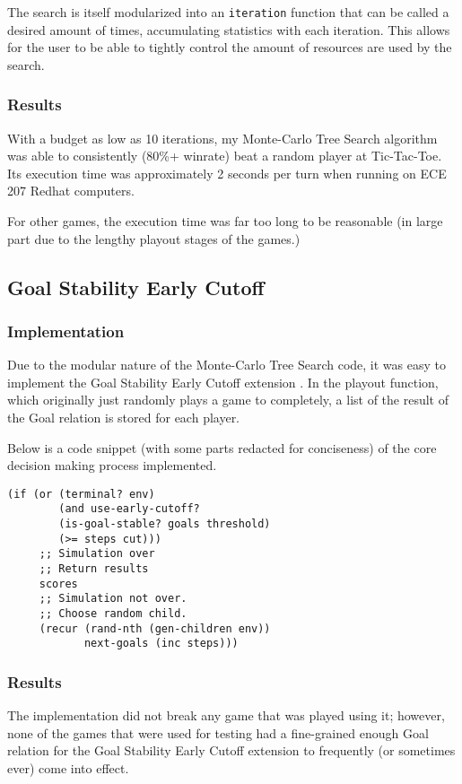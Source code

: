 \documentclass[letterpaper]{article}
\begin{document}
The search is itself modularized into an \texttt{iteration} function that can be called a desired amount of times, accumulating statistics with each iteration. This allows for the user to be able to tightly control the amount of resources are used by the search.

\subsubsection{Results}
With a budget as low as 10 iterations, my Monte-Carlo Tree Search algorithm was able to consistently (80\%+ winrate) beat a random player at Tic-Tac-Toe. Its execution time was approximately 2 seconds per turn when running on ECE 207 Redhat computers.

For other games, the execution time was far too long to be reasonable (in large part due to the lengthy playout stages of the games.)

\subsection{Goal Stability Early Cutoff}
\subsubsection{Implementation}
Due to the modular nature of the Monte-Carlo Tree Search code, it was easy to implement the Goal Stability Early Cutoff extension \cite{finnsson2012generalized}. In the playout function, which originally just randomly plays a game to completely, a list of the result of the Goal relation is stored for each player.

Below is a code snippet (with some parts redacted for conciseness) of the core decision making process implemented.
\begin{lstlisting}[frame=single,caption=Clojure implementation of Goal Stability Early Cutoff]
(if (or (terminal? env)
        (and use-early-cutoff?
        (is-goal-stable? goals threshold)
        (>= steps cut)))
     ;; Simulation over
     ;; Return results
     scores
     ;; Simulation not over.
     ;; Choose random child.
     (recur (rand-nth (gen-children env)) 
            next-goals (inc steps)))
\end{lstlisting}

\subsubsection{Results}
The implementation did not break any game that was played using it; however, none of the games that were used for testing had a fine-grained enough Goal relation for the Goal Stability Early Cutoff extension to frequently (or sometimes ever) come into effect.
\end{document}
